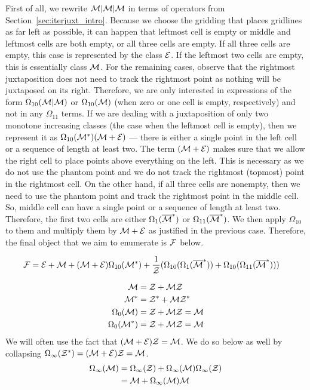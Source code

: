 \documentclass[12pt, a4paper, twoside]{report}
\begin{document}
First of all, we rewrite $\mathcal{M}|\mathcal{M}|\mathcal{M}$ in terms of operators from Section~\ref{sec:iterjuxt_intro}. Because we choose the gridding that places gridlines as far left as possible, it can happen that leftmost cell is empty or middle and leftmost cells are both empty, or all three cells are empty. If all three cells are empty, this case is represented by the class $\mathcal{E}$. If the leftmost two cells are empty, this is essentially class $\mathcal{M}$. For the remaining cases, observe that the rightmost juxtaposition does not need to track the rightmost point as nothing will be juxtaposed on its right. Therefore, we are only interested in expressions of the form $\Omega_{10}(\mathcal{M}|\mathcal{M})$ or $\Omega_{10}(\mathcal{M})$ (when zero or one cell is empty, respectively) and not in any $\Omega_{11}$ terms. If we are dealing with a juxtaposition of only two monotone increasing classes (the case when the leftmost cell is empty), then we represent it as $\Omega_{10}(\mathcal{M}^*)(\mathcal{M}+\mathcal{E})$ --- there is either a single point in the left cell or a sequence of length at least two. The term $(\mathcal{M}+\mathcal{E})$ makes sure that we allow the right cell to place points above everything on the left. This is necessary as we do not use the phantom point and we do not track the rightmost (topmost) point in the rightmost cell.  On the other hand, if all three cells are nonempty, then we need to use the phantom point and track the rightmost point in the middle cell. So, middle cell can have a single point or a sequence of length at least two. Therefore, the first two cells are either $\Omega_1(\overline{\mathcal{M}}^*)$ or $\Omega_{11}(\overline{\mathcal{M}}^*)$. We then apply $\Omega_{10}$ to them and multiply them by $\mathcal{M}+\mathcal{E}$ as justified in the previous case. Therefore, the final object that we aim to enumerate is $\mathcal{F}$ below.


\begin{align}
  \mathcal{F} &= \mathcal{E} + \mathcal{M} + (\mathcal{M}+\mathcal{E})\Omega_{10}(\mathcal{M}^*) +\frac{1}{\mathcal{Z}}(\Omega_{10}(\Omega_1(\overline{\mathcal{M}}^*)) + \Omega_{10}(\Omega_{11}(\overline{\mathcal{M}}^*)))
\label{eq:mmm_final}
\end{align}

\begin{align}
  \mathcal{M} &= \mathcal{Z} + \mathcal{M}\mathcal{Z} \label{eq:mmm_m}\\
  \mathcal{M}^* &=  \mathcal{Z}^* + \mathcal{M}\mathcal{Z}^*\\
  \Omega_0(\mathcal{M})&= \mathcal{Z} + \mathcal{M}\mathcal{Z} = \mathcal{M}\\
  \Omega_0(\mathcal{M}^*) &= \mathcal{Z} + \mathcal{M}\mathcal{Z} = \mathcal{M}
\end{align}
We will often use the fact that $(\mathcal{M}+\mathcal{E})\mathcal{Z} = \mathcal{M}$. We do so below as well by collapsing $\Omega_\infty(\mathcal{Z}^*) = (\mathcal{M}+\mathcal{E})\mathcal{Z} = \mathcal{M}$.
\begin{align}
  \begin{aligned}
    \Omega_\infty(\mathcal{M}) &= \Omega_\infty(\mathcal{Z}) + \Omega_\infty(\mathcal{M})\Omega_\infty(\mathcal{Z})\\
    &= \mathcal{M} + \Omega_\infty(\mathcal{M})\mathcal{M}
  \end{aligned}
      \label{eq:mmm_omegainfty}
\end{align}
\end{document}
